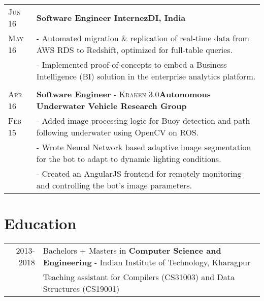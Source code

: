 \documentclass[a4paper,10pt]{extarticle} %
\begin{document}
\begin{tabularx}{\linewidth}{ l | X }
\textsc{Jun 16} & \textbf{Software Engineer Intern}\hfill\textbf{ezDI, India}\\
\textsc{May 16}& {- Automated migration \& replication of real-time data from AWS RDS to Redshift, optimized for full-table queries.}\\
& {- Implemented proof-of-concepts to embed a Business Intelligence (BI) solution in the enterprise analytics platform.}\\
\multicolumn{2}{c}{} \\

\textsc{Apr 16} & \textbf{Software Engineer} \textsc{- Kraken 3.0}\hfill\textbf{Autonomous Underwater Vehicle Research Group}\\
\textsc{Feb 15} & {- Added image processing logic for Buoy detection and path following underwater using OpenCV on ROS.}\\
& {- Wrote Neural Network based adaptive image segmentation for the bot to adapt to dynamic lighting conditions.}\\
& {- Created an AngularJS frontend for remotely monitoring and controlling the bot's image parameters.}\\
\end{tabularx}


\vspace{0.1cm}
\section{\textcolor{primary}{Education}}

\begin{tabular}{r|p{17.5cm}}	
\textsc{2013-2018} & Bachelors + Masters in \textbf{Computer Science and Engineering} - Indian Institute of Technology, Kharagpur\\
&Teaching assistant for Compilers (CS31003) and Data Structures (CS19001)\\
\end{tabular}
\end{document}

